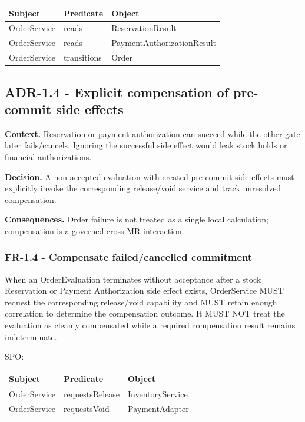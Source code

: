 \documentclass[
  10pt,
]{article}
\begin{document}
\begin{longtable}[]{@{}lll@{}}
\toprule\noalign{}
Subject & Predicate & Object \\
\midrule\noalign{}
\endhead
\bottomrule\noalign{}
\endlastfoot
OrderService & reads & ReservationResult \\
OrderService & reads & PaymentAuthorizationResult \\
OrderService & transitions & Order \\
\end{longtable}

\subsection{ADR-1.4 - Explicit compensation of pre-commit side
effects}\label{adr-14---explicit-compensation-of-pre-commit-side-effects}

\textbf{Context.} Reservation or payment authorization can succeed while
the other gate later fails/cancels. Ignoring the successful side effect
would leak stock holds or financial authorizations.

\textbf{Decision.} A non-accepted evaluation with created pre-commit
side effects must explicitly invoke the corresponding release/void
service and track unresolved compensation.

\textbf{Consequences.} Order failure is not treated as a single local
calculation; compensation is a governed cross-MR interaction.

\subsubsection{FR-1.4 - Compensate failed/cancelled
commitment}\label{fr-14---compensate-failedcancelled-commitment}

When an OrderEvaluation terminates without acceptance after a stock
Reservation or Payment Authorization side effect exists, OrderService
MUST request the corresponding release/void capability and MUST retain
enough correlation to determine the compensation outcome. It MUST NOT
treat the evaluation as cleanly compensated while a required
compensation result remains indeterminate.

SPO:

\begin{longtable}[]{@{}lll@{}}
\toprule\noalign{}
Subject & Predicate & Object \\
\midrule\noalign{}
\endhead
\bottomrule\noalign{}
\endlastfoot
OrderService & requestsRelease & InventoryService \\
OrderService & requestsVoid & PaymentAdapter \\
\end{longtable}
\end{document}
